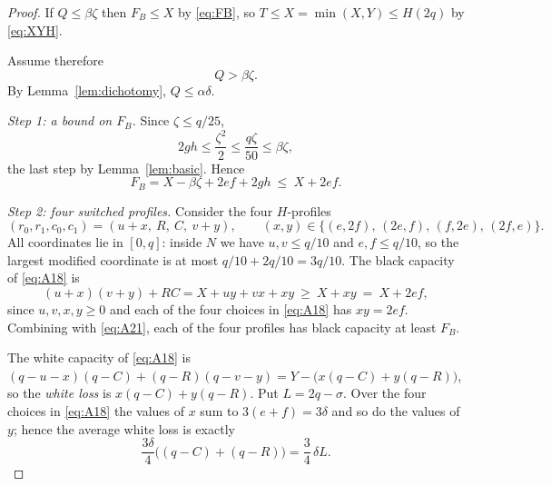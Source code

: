 \documentclass[11pt]{amsart}
\theoremstyle{definition}
\theoremstyle{remark}
\begin{document}
\begin{proof}
If $Q\le\beta\zeta$ then $F_B\le X$ by \eqref{eq:FB}, so $T\le X=\min(X,Y)\le H(2q)$ by \eqref{eq:XYH}.

Assume therefore
\begin{equation}\label{eq:A17}
Q>\beta\zeta .
\end{equation}
By Lemma~\ref{lem:dichotomy}, $Q\le\alpha\delta$.

\emph{Step 1: a bound on $F_B$.} Since $\zeta\le q/25$,
\begin{equation}\label{eq:A21a}
2gh\le\frac{\zeta^2}{2}\le\frac{q\zeta}{50}\le\beta\zeta ,
\end{equation}
the last step by Lemma~\ref{lem:basic}. Hence
\begin{equation}\label{eq:A21}
F_B=X-\beta\zeta+2ef+2gh\ \le\ X+2ef .
\end{equation}

\emph{Step 2: four switched profiles.} Consider the four $H$-profiles
\begin{equation}\label{eq:A18}
(r_0,r_1,c_0,c_1)=(u+x,\ R,\ C,\ v+y),
\qquad (x,y)\in\bigl\{(e,2f),\,(2e,f),\,(f,2e),\,(2f,e)\bigr\} .
\end{equation}
All coordinates lie in $[0,q]$: inside $N$ we have $u,v\le q/10$ and $e,f\le q/10$, so the largest modified coordinate is at most $q/10+2q/10=3q/10$. The black capacity of \eqref{eq:A18} is
\begin{equation}\label{eq:A20}
(u+x)(v+y)+RC=X+uy+vx+xy\ \ge\ X+xy\ =\ X+2ef ,
\end{equation}
since $u,v,x,y\ge0$ and each of the four choices in \eqref{eq:A18} has $xy=2ef$. Combining with \eqref{eq:A21}, each of the four profiles has black capacity at least $F_B$.

The white capacity of \eqref{eq:A18} is $(q-u-x)(q-C)+(q-R)(q-v-y)=Y-\bigl(x(q-C)+y(q-R)\bigr)$, so the \emph{white loss} is $x(q-C)+y(q-R)$. Put $L=2q-\sigma$. Over the four choices in \eqref{eq:A18} the values of $x$ sum to $3(e+f)=3\delta$ and so do the values of $y$; hence the average white loss is exactly
\begin{equation}\label{eq:A22}
\frac{3\delta}{4}\bigl((q-C)+(q-R)\bigr)=\frac34\,\delta L .
\end{equation}


\end{proof}
\end{document}
